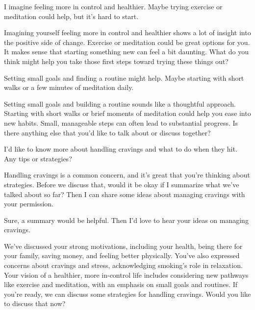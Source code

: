 \begin{clientbox}
	I imagine feeling more in control and healthier. Maybe trying exercise or meditation could help, but it's hard to start.
\end{clientbox}

\begin{counsellorbox}
	Imagining yourself feeling more in control and healthier shows a lot of insight into the positive side of change. Exercise or meditation could be great options for you. It makes sense that starting something new can feel a bit daunting. What do you think might help you take those first steps toward trying these things out?
\end{counsellorbox}

\begin{clientbox}
	Setting small goals and finding a routine might help. Maybe starting with short walks or a few minutes of meditation daily.
\end{clientbox}

\begin{counsellorbox}
	Setting small goals and building a routine sounds like a thoughtful approach. Starting with short walks or brief moments of meditation could help you ease into new habits. Small, manageable steps can often lead to substantial progress. Is there anything else that you’d like to talk about or discuss together?
\end{counsellorbox}

\begin{clientbox}
	I'd like to know more about handling cravings and what to do when they hit. Any tips or strategies?
\end{clientbox}

\begin{counsellorbox}
	Handling cravings is a common concern, and it's great that you're thinking about strategies. Before we discuss that, would it be okay if I summarize what we've talked about so far? Then I can share some ideas about managing cravings with your permission.
\end{counsellorbox}

\begin{clientbox}
	Sure, a summary would be helpful. Then I'd love to hear your ideas on managing cravings.
\end{clientbox}

\begin{counsellorbox}
	We've discussed your strong motivations, including your health, being there for your family, saving money, and feeling better physically. You've also expressed concerns about cravings and stress, acknowledging smoking's role in relaxation. Your vision of a healthier, more in-control life includes considering new pathways like exercise and meditation, with an emphasis on small goals and routines. If you're ready, we can discuss some strategies for handling cravings. Would you like to discuss that now?
\end{counsellorbox}

